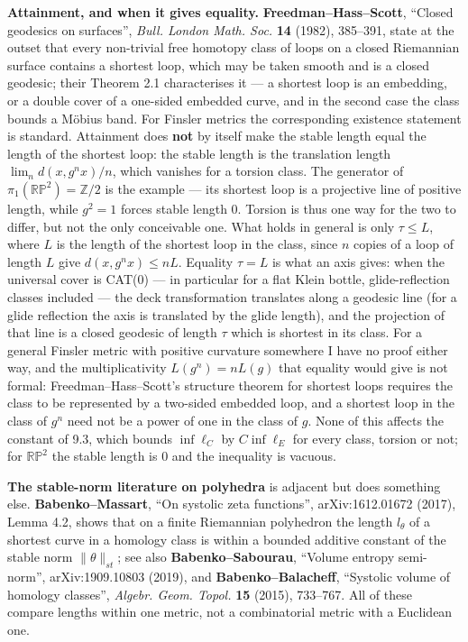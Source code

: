\documentclass[
]{article}
\begin{document}
\textbf{Attainment, and when it gives equality.}
\textbf{Freedman--Hass--Scott}, ``Closed geodesics on surfaces'',
\emph{Bull. London Math. Soc.} \textbf{14} (1982), 385--391, state at
the outset that every non-trivial free homotopy class of loops on a
closed Riemannian surface contains a shortest loop, which may be taken
smooth and is a closed geodesic; their Theorem 2.1 characterises it ---
a shortest loop is an embedding, or a double cover of a one-sided
embedded curve, and in the second case the class bounds a M\"{o}bius
band. For Finsler metrics the corresponding existence statement is
standard. Attainment does \textbf{not} by itself make the stable length
equal the length of the shortest loop: the stable length is the
translation length \(\lim_n d(x,g^nx)/n\), which vanishes for a torsion
class. The generator of \(\pi_1(\mathbb{RP}^2)=\mathbb{Z}/2\) is the
example --- its shortest loop is a projective line of positive length,
while \(g^2=1\) forces stable length \(0\). Torsion is thus one way for
the two to differ, but not the only conceivable one. What holds in
general is only \(\tau\le L\), where \(L\) is the length of the shortest
loop in the class, since \(n\) copies of a loop of length \(L\) give
\(d(x,g^nx)\le nL\). Equality \(\tau=L\) is what an axis gives: when the
universal cover is CAT(0) --- in particular for a flat Klein bottle,
glide-reflection classes included --- the deck transformation translates
along a geodesic line (for a glide reflection the axis is translated by
the glide length), and the projection of that line is a closed geodesic
of length \(\tau\) which is shortest in its class. For a general Finsler
metric with positive curvature somewhere I have no proof either way, and
the multiplicativity \(L(g^n)=nL(g)\) that equality would give is not
formal: Freedman--Hass--Scott's structure theorem for shortest loops
requires the class to be represented by a two-sided embedded loop, and a
shortest loop in the class of \(g^n\) need not be a power of one in the
class of \(g\). None of this affects the constant of 9.3, which bounds
\(\inf\ell_C\) by \(C\inf\ell_E\) for every class, torsion or not; for
\(\mathbb{RP}^2\) the stable length is \(0\) and the inequality is
vacuous.

\textbf{The stable-norm literature on polyhedra} is adjacent but does
something else. \textbf{Babenko--Massart}, ``On systolic zeta
functions'', arXiv:1612.01672 (2017), Lemma 4.2, shows that on a finite
Riemannian polyhedron the length \(l_\theta\) of a shortest curve in a
homology class is within a bounded additive constant of the stable norm
\(\lVert\theta\rVert_{st}\); see also \textbf{Babenko--Sabourau},
``Volume entropy semi-norm'', arXiv:1909.10803 (2019), and
\textbf{Babenko--Balacheff}, ``Systolic volume of homology classes'',
\emph{Algebr. Geom. Topol.} \textbf{15} (2015), 733--767. All of these
compare lengths within one metric, not a combinatorial metric with a
Euclidean one.
\end{document}
